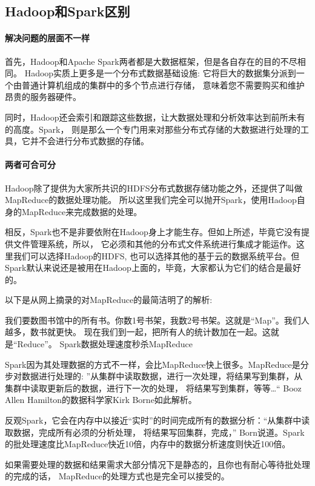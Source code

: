 \documentclass{book}
\begin{document}
\subsection{Hadoop和Spark区别}

\paragraph{解决问题的层面不一样}
首先，Hadoop和Apache Spark两者都是大数据框架，但是各自存在的目的不尽相同。
Hadoop实质上更多是一个分布式数据基础设施: 它将巨大的数据集分派到一个由普通计算机组成的集群中的多个节点进行存储，
意味着您不需要购买和维护昂贵的服务器硬件。

同时，Hadoop还会索引和跟踪这些数据，让大数据处理和分析效率达到前所未有的高度。Spark，
则是那么一个专门用来对那些分布式存储的大数据进行处理的工具，它并不会进行分布式数据的存储。

\paragraph{两者可合可分}
Hadoop除了提供为大家所共识的HDFS分布式数据存储功能之外，还提供了叫做MapReduce的数据处理功能。
所以这里我们完全可以抛开Spark，使用Hadoop自身的MapReduce来完成数据的处理。

相反，Spark也不是非要依附在Hadoop身上才能生存。但如上所述，毕竟它没有提供文件管理系统，所以，
它必须和其他的分布式文件系统进行集成才能运作。这里我们可以选择Hadoop的HDFS,
也可以选择其他的基于云的数据系统平台。但Spark默认来说还是被用在Hadoop上面的，毕竟，大家都认为它们的结合是最好的。

以下是从网上摘录的对MapReduce的最简洁明了的解析:

我们要数图书馆中的所有书。你数1号书架，我数2号书架。这就是“Map”。我们人越多，数书就更快。
现在我们到一起，把所有人的统计数加在一起。这就是“Reduce”。
Spark数据处理速度秒杀MapReduce

Spark因为其处理数据的方式不一样，会比MapReduce快上很多。MapReduce是分步对数据进行处理的: 
”从集群中读取数据，进行一次处理，将结果写到集群，从集群中读取更新后的数据，进行下一次的处理，
将结果写到集群，等等…“ Booz Allen Hamilton的数据科学家Kirk Borne如此解析。

反观Spark，它会在内存中以接近“实时”的时间完成所有的数据分析：“从集群中读取数据，完成所有必须的分析处理，
将结果写回集群，完成，” Born说道。Spark的批处理速度比MapReduce快近10倍，内存中的数据分析速度则快近100倍。

如果需要处理的数据和结果需求大部分情况下是静态的，且你也有耐心等待批处理的完成的话，
MapReduce的处理方式也是完全可以接受的。
\end{document}
